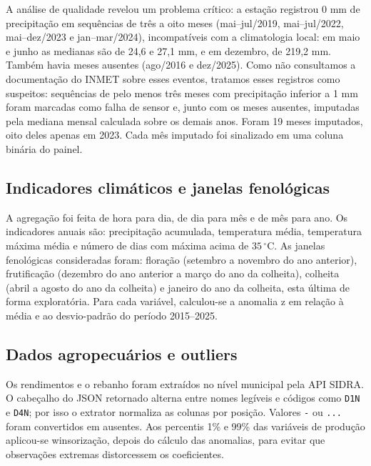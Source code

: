 \documentclass{RBCA}
\begin{document}
A an\'alise de qualidade revelou um problema cr\'itico: a esta\c{c}\~ao registrou $0$ mm de precipita\c{c}\~ao em sequ\^encias de tr\^es a oito meses (mai--jul/2019, mai--jul/2022, mai--dez/2023 e jan--mar/2024), incompat\'iveis com a climatologia local: em maio e junho as medianas s\~ao de 24,6 e 27,1 mm, e em dezembro, de 219,2 mm. Tamb\'em havia meses ausentes (ago/2016 e dez/2025). Como n\~ao consultamos a documenta\c{c}\~ao do INMET sobre esses eventos, tratamos esses registros como suspeitos: sequ\^encias de pelo menos tr\^es meses com precipita\c{c}\~ao inferior a 1 mm foram marcadas como falha de sensor e, junto com os meses ausentes, imputadas pela mediana mensal calculada sobre os demais anos. Foram 19 meses imputados, oito deles apenas em 2023. Cada m\^es imputado foi sinalizado em uma coluna bin\'aria do painel.

\subsection{Indicadores clim\'aticos e janelas fenol\'ogicas}

A agrega\c{c}\~ao foi feita de hora para dia, de dia para m\^es e de m\^es para ano. Os indicadores anuais s\~ao: precipita\c{c}\~ao acumulada, temperatura m\'edia, temperatura m\'axima m\'edia e n\'umero de dias com m\'axima acima de $35\,^\circ$C. As janelas fenol\'ogicas consideradas foram: flora\c{c}\~ao (setembro a novembro do ano anterior), frutifica\c{c}\~ao (dezembro do ano anterior a mar\c{c}o do ano da colheita), colheita (abril a agosto do ano da colheita) e janeiro do ano da colheita, esta \'ultima de forma explorat\'oria. Para cada vari\'avel, calculou-se a anomalia z em rela\c{c}\~ao \`a m\'edia e ao desvio-padr\~ao do per\'iodo 2015--2025.

\subsection{Dados agropecu\'arios e outliers}

Os rendimentos e o rebanho foram extra\'idos no n\'ivel municipal pela API SIDRA. O cabe\c{c}alho do JSON retornado alterna entre nomes leg\'iveis e c\'odigos como \texttt{D1N} e \texttt{D4N}; por isso o extrator normaliza as colunas por posi\c{c}\~ao. Valores \texttt{-} ou \texttt{...} foram convertidos em ausentes. Aos percentis 1\% e 99\% das vari\'aveis de produ\c{c}\~ao aplicou-se winsoriza\c{c}\~ao, depois do c\'alculo das anomalias, para evitar que observa\c{c}\~oes extremas distorcessem os coeficientes.
\end{document}
